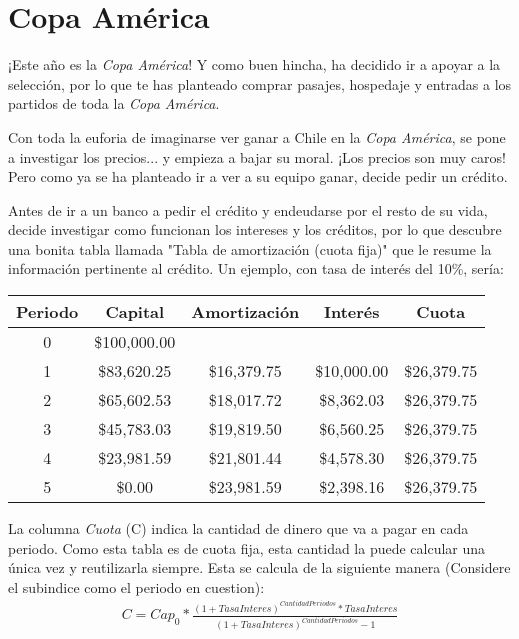\section{Copa América}

¡Este año es la \textit{Copa América}! Y como buen hincha, ha decidido ir a apoyar a la selección, por lo que te has planteado comprar pasajes, hospedaje y entradas a los partidos de toda la \textit{Copa América}.

Con toda la euforia de imaginarse ver ganar a Chile en la \textit{Copa América}, se pone a investigar los precios... y empieza a bajar su moral. ¡Los precios son muy caros! Pero como ya se ha planteado ir a ver a su equipo ganar, decide pedir un crédito.

Antes de ir a un banco a pedir el crédito y endeudarse por el resto de su vida, decide investigar como funcionan los intereses y los créditos, por lo que descubre una bonita tabla llamada "Tabla de amortización (cuota fija)" que le resume la información pertinente al crédito. Un ejemplo, con tasa de interés del 10\%, sería:

\begin{center}
\begin{tabular}{|c|c|c|c|c|}
    \hline
    Periodo & Capital & Amortización & Interés & Cuota \\
    \hline
    0 & \$100,000.00 & & & \\
    \hline
	1 & \$83,620.25 & \$16,379.75 & \$10,000.00 & \$26,379.75 \\
    \hline
	2 & \$65,602.53 & \$18,017.72 & \$8,362.03 & \$26,379.75 \\
    \hline
	3 & \$45,783.03 & \$19,819.50 & \$6,560.25 & \$26,379.75 \\
    \hline
	4 & \$23,981.59 & \$21,801.44 & \$4,578.30 & \$26,379.75 \\
    \hline
	5 & \$0.00 & \$23,981.59 & \$2,398.16 & \$26,379.75 \\
    \hline
\end{tabular}
\end{center}

La columna \textit{Cuota} (C) indica la cantidad de dinero que va a pagar en cada periodo. Como esta tabla es de cuota fija, esta cantidad la puede calcular una única vez y reutilizarla siempre. Esta se calcula de la siguiente manera (Considere el subindice como el periodo en cuestion):
\begin{align*}
    C = Cap_0 * \frac{(1+TasaInteres)^{CantidadPeriodos} * TasaInteres}{(1+TasaInteres)^{CantidadPeriodos}  - 1}
\end{align*}

